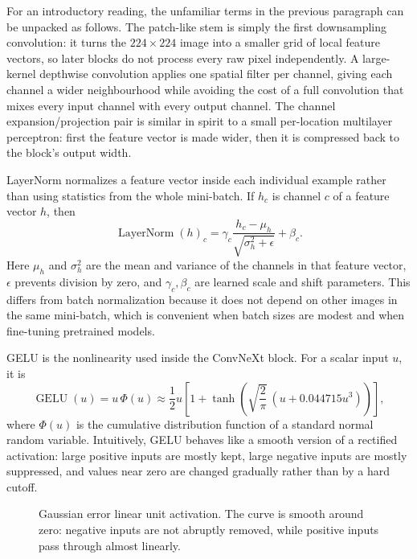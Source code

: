\documentclass[11pt,a4paper]{article}
\begin{document}
For an introductory reading, the unfamiliar terms in the previous paragraph
can be unpacked as follows. The patch-like stem is simply the first
downsampling convolution: it turns the \(224\times224\) image into a smaller
grid of local feature vectors, so later blocks do not process every raw pixel
independently. A large-kernel depthwise convolution applies one spatial filter
per channel, giving each channel a wider neighbourhood while avoiding the cost
of a full convolution that mixes every input channel with every output channel.
The channel expansion/projection pair is similar in spirit to a small
per-location multilayer perceptron: first the feature vector is made wider,
then it is compressed back to the block's output width.

LayerNorm normalizes a feature vector inside each individual example rather
than using statistics from the whole mini-batch. If \(h_c\) is channel \(c\)
of a feature vector \(h\), then
\[
  \operatorname{LayerNorm}(h)_c
  =
  \gamma_c
  \frac{h_c-\mu_h}{\sqrt{\sigma_h^2+\epsilon}}
  + \beta_c .
\]
Here \(\mu_h\) and \(\sigma_h^2\) are the mean and variance of the channels in
that feature vector, \(\epsilon\) prevents division by zero, and
\(\gamma_c,\beta_c\) are learned scale and shift parameters. This differs from
batch normalization because it does not depend on other images in the same
mini-batch, which is convenient when batch sizes are modest and when
fine-tuning pretrained models.

GELU is the nonlinearity used inside the ConvNeXt block. For a scalar input
\(u\), it is
\[
  \operatorname{GELU}(u)=u\,\Phi(u)
  \approx
  \frac{1}{2}u
  \left[
    1+\tanh\!\left(\sqrt{\frac{2}{\pi}}\,(u+0.044715u^3)\right)
  \right],
\]
where \(\Phi(u)\) is the cumulative distribution function of a standard
normal random variable. Intuitively, GELU behaves like a smooth version of a
rectified activation: large positive inputs are mostly kept, large negative
inputs are mostly suppressed, and values near zero are changed gradually
rather than by a hard cutoff.

\begin{figure}[H]
\centering
{}
\caption{Gaussian error linear unit activation. The curve is smooth around
zero: negative inputs are not abruptly removed, while positive inputs pass
through almost linearly.}
\label{fig:gelu}
\end{figure}
\end{document}
